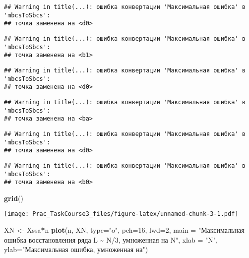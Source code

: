 \documentclass[
]{article}
\newenvironment{Shaded}{\begin{snugshade}}{\end{snugshade}}
\newcommand{\AttributeTok}[1]{\textcolor[rgb]{0.13,0.29,0.53}{#1}}
\newcommand{\DecValTok}[1]{\textcolor[rgb]{0.00,0.00,0.81}{#1}}
\newcommand{\FunctionTok}[1]{\textcolor[rgb]{0.13,0.29,0.53}{\textbf{#1}}}
\newcommand{\NormalTok}[1]{#1}
\newcommand{\OtherTok}[1]{\textcolor[rgb]{0.56,0.35,0.01}{#1}}
\newcommand{\SpecialCharTok}[1]{\textcolor[rgb]{0.81,0.36,0.00}{\textbf{#1}}}
\newcommand{\StringTok}[1]{\textcolor[rgb]{0.31,0.60,0.02}{#1}}
\begin{document}
\begin{verbatim}
## Warning in title(...): ошибка конвертации 'Максимальная ошибка' в 'mbcsToSbcs':
## точка заменена на <d0>
\end{verbatim}

\begin{verbatim}
## Warning in title(...): ошибка конвертации 'Максимальная ошибка' в 'mbcsToSbcs':
## точка заменена на <b1>
\end{verbatim}

\begin{verbatim}
## Warning in title(...): ошибка конвертации 'Максимальная ошибка' в 'mbcsToSbcs':
## точка заменена на <d0>
\end{verbatim}

\begin{verbatim}
## Warning in title(...): ошибка конвертации 'Максимальная ошибка' в 'mbcsToSbcs':
## точка заменена на <ba>
\end{verbatim}

\begin{verbatim}
## Warning in title(...): ошибка конвертации 'Максимальная ошибка' в 'mbcsToSbcs':
## точка заменена на <d0>
\end{verbatim}

\begin{verbatim}
## Warning in title(...): ошибка конвертации 'Максимальная ошибка' в 'mbcsToSbcs':
## точка заменена на <b0>
\end{verbatim}

\begin{Shaded}
\begin{Highlighting}[]
\FunctionTok{grid}\NormalTok{()}
\end{Highlighting}
\end{Shaded}

\texttt{[image: Prac\_TaskCourse3\_files/figure-latex/unnamed-chunk-3-1.pdf]}

\begin{Shaded}
\begin{Highlighting}[]
\NormalTok{XN }\OtherTok{\textless{}{-}}\NormalTok{ Xssa}\SpecialCharTok{*}\NormalTok{n}
\FunctionTok{plot}\NormalTok{(n, XN, }\AttributeTok{type=}\StringTok{"o"}\NormalTok{, }\AttributeTok{pch=}\DecValTok{16}\NormalTok{, }\AttributeTok{lwd=}\DecValTok{2}\NormalTok{, }\AttributeTok{main =} \StringTok{"Максимальная ошибка восстановления ряда L \textasciitilde{} N/3, умноженная на N"}\NormalTok{,}
     \AttributeTok{xlab =} \StringTok{"N"}\NormalTok{, }\AttributeTok{ylab=}\StringTok{"Максимальная ошибка, умноженная на"}\NormalTok{)}
\end{Highlighting}
\end{Shaded}
\end{document}

